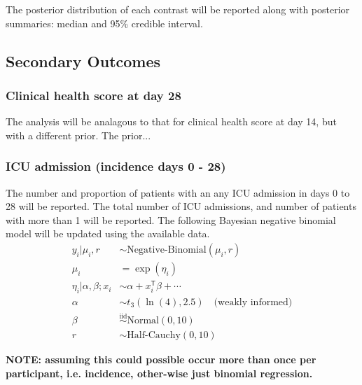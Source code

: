 \documentclass[11pt,parskip=half-]{scrartcl}
\begin{document}
The posterior distribution of each contrast will be reported along with posterior summaries: median and 95\% credible interval.

\subsection{Secondary Outcomes}

\subsubsection{Clinical health score at day 28}
The analysis will be analagous to that for clinical health score at day 14, but with a different prior. The prior...

\subsubsection{ICU admission (incidence days 0 - 28)}
The number and proportion of patients with an any ICU admission in days 0 to 28 will be reported. The total number of ICU admissions, and number of patients with more than 1 will be reported. The following Bayesian negative binomial model will be updated using the available data.
$$
    \begin{aligned}
        y_i|\mu_i,r                 & \sim \text{Negative-Binomial}(\mu_i, r)              \\
        \mu_i                       & = \exp(\eta_i)                                       \\
        \eta_i | \alpha, \beta; x_i & \sim \alpha + x_i^\mathsf{T}\beta + \cdots           \\
        \alpha                      & \sim t_3(\ln(4), 2.5) \quad \text{(weakly informed)} \\
        \beta                       & \overset{\text{iid}}{\sim} \text{Normal}(0, 10)      \\
        r                           & \sim \text{Half-Cauchy}(0, 10)
    \end{aligned}
$$

\textbf{NOTE: assuming this could possible occur more than once per participant, i.e. incidence, other-wise just binomial regression.}
\end{document}
